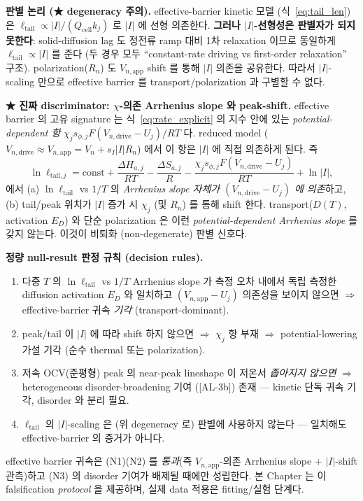 \documentclass[11pt,a4paper]{article}
\newcommand{\app}{\mathrm{app}}
\newcommand{\dimedrive}{\mathrm{drive}}
\newcommand{\cell}{\mathrm{cell}}
\newcommand{\AL}[1]{\textsf{[AL-#1]}}
\begin{document}
\textbf{판별 논리 (★ degeneracy 주의).} effective-barrier kinetic 모델
(식~\eqref{eq:tail_len}) 은 $\ell_{\mathrm{tail}}\propto|I|/(Q_\cell k_j)$ 로 $|I|$ 에
선형 의존한다. \textbf{그러나 $|I|$-선형성은 판별자가 되지 못한다}: solid-diffusion
lag 도 정전류 ramp 대비 1차 relaxation 이므로 동일하게 $\ell_{\mathrm{tail}}\propto|I|$
를 준다 (두 경우 모두 ``constant-rate driving vs first-order relaxation'' 구조).
polarization($R_n$) 도 $V_{n,\app}$ shift 를 통해 $|I|$ 의존을 공유한다. 따라서
$|I|$-scaling 만으로 effective barrier 를 transport/polarization 과 구별할 수 없다.

\textbf{★ 진짜 discriminator: $\chi$-의존 Arrhenius slope 와 peak-shift.}
effective barrier 의 고유 signature 는 식~\eqref{eq:rate_explicit} 의 지수 안에 있는
\emph{potential-dependent 항} $\chi_j s_{\phi,j}F(V_{n,\dimedrive}-U_j)/RT$ 다. reduced
model ($V_{n,\dimedrive}\approx V_{n,\app}=V_n+s_I|I|R_n$) 에서 이 항은 $|I|$ 에 직접
의존하게 된다. 즉
\begin{equation}
\ln\ell_{\mathrm{tail},j} = \mathrm{const} + \frac{\Delta H_{a,j}}{RT}
- \frac{\Delta S_{a,j}}{R} - \frac{\chi_j s_{\phi,j}F(V_{n,\dimedrive}-U_j)}{RT} + \ln|I|,
\label{eq:discriminator}
\end{equation}
에서 (a) $\ln\ell_{\mathrm{tail}}$ vs $1/T$ 의 \emph{Arrhenius slope 자체가
$(V_{n,\dimedrive}-U_j)$ 에 의존}하고, (b) tail/peak 위치가 $|I|$ 증가 시 $\chi_j$ (및
$R_n$) 를 통해 shift 한다. transport($D(T)$, activation $E_D$) 와 단순 polarization 은
이런 \emph{potential-dependent Arrhenius slope} 를 갖지 않는다. 이것이 비퇴화
(non-degenerate) 판별 신호다.

\textbf{정량 null-result 판정 규칙 (decision rules).}
\begin{enumerate}[label=(N\arabic*)]
\item 다중 $T$ 의 $\ln\ell_{\mathrm{tail}}$ vs $1/T$ Arrhenius slope 가 측정 오차
  내에서 독립 측정한 diffusion activation $E_D$ 와 일치하고 $(V_{n,\app}-U_j)$ 의존성을
  보이지 않으면 $\Rightarrow$ effective-barrier 귀속 \emph{기각} (transport-dominant).
\item peak/tail 이 $|I|$ 에 따라 shift 하지 않으면 $\Rightarrow$ $\chi_j$ 항 부재
  $\Rightarrow$ potential-lowering 가설 기각 (순수 thermal 또는 polarization).
\item 저속 OCV(준평형) peak 의 near-peak lineshape 이 저온서 \emph{좁아지지 않으면}
  $\Rightarrow$ heterogeneous disorder-broadening 기여 (\AL{3b}) 존재 — kinetic 단독
  귀속 기각, disorder 와 분리 필요.
\item $\ell_{\mathrm{tail}}$ 의 $|I|$-scaling 은 (위 degeneracy 로) 판별에 사용하지
  않는다 — 일치해도 effective-barrier 의 증거가 아니다.
\end{enumerate}
effective barrier 귀속은 (N1)(N2) 를 \emph{통과}(즉 $V_{n,\app}$-의존 Arrhenius slope
+ $|I|$-shift 관측)하고 (N3) 의 disorder 기여가 배제될 때에만 성립한다. 본 Chapter 는
이 falsification \emph{protocol} 을 제공하며, 실제 data 적용은 fitting/실험 단계다.
\end{document}
